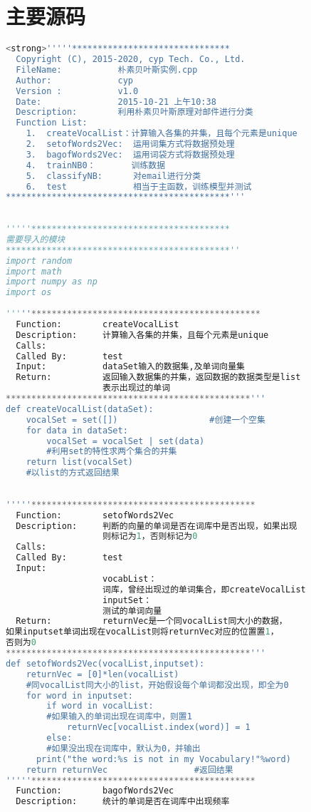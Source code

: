 ﻿\chapter{主要源码}

\begin{lstlisting}[language=python]
<strong>'''''******************************* 
  Copyright (C), 2015-2020, cyp Tech. Co., Ltd. 
  FileName:           朴素贝叶斯实例.cpp 
  Author:             cyp      
  Version :           v1.0           
  Date:               2015-10-21 上午10:38 
  Description:        利用朴素贝叶斯原理对邮件进行分类      
  Function List:       
    1.  createVocalList：计算输入各集的并集，且每个元素是unique 
    2.  setofWords2Vec:  运用词集方式将数据预处理 
    3.  bagofWords2Vec:  运用词袋方式将数据预处理 
    4.  trainNB0：       训练数据 
    5.  classifyNB:      对email进行分类 
    6.  test             相当于主函数，训练模型并测试 
********************************************'''  
  
  
'''''*************************************** 
需要导入的模块 
********************************************''  
import random  
import math  
import numpy as np  
import os  
  
'''''********************************************* 
  Function:        createVocalList 
  Description:     计算输入各集的并集，且每个元素是unique 
  Calls:            
  Called By:       test 
  Input:           dataSet输入的数据集,及单词向量集 
  Return:          返回输入数据集的并集，返回数据的数据类型是list 
                   表示出现过的单词 
************************************************'''  
def createVocalList(dataSet):  
    vocalSet = set([])                  #创建一个空集  
    for data in dataSet:  
        vocalSet = vocalSet | set(data) 
        #利用set的特性求两个集合的并集  
    return list(vocalSet)               
    #以list的方式返回结果  
      
      
'''''******************************************** 
  Function:        setofWords2Vec 
  Description:     判断的向量的单词是否在词库中是否出现，如果出现 
                   则标记为1，否则标记为0 
  Calls:            
  Called By:       test 
  Input: 
                   vocabList： 
                   词库，曾经出现过的单词集合，即createVocalList 
                   inputSet： 
                   测试的单词向量 
  Return:          returnVec是一个同vocalList同大小的数据，
如果inputset单词出现在vocalList则将returnVec对应的位置置1，
否则为0 
************************************************'''  
def setofWords2Vec(vocalList,inputset):  
    returnVec = [0]*len(vocalList)         
    #同vocalList同大小的list，开始假设每个单词都没出现，即全为0  
    for word in inputset:                                          
        if word in vocalList:        
        #如果输入的单词出现在词库中，则置1     
            returnVec[vocalList.index(word)] = 1  
        else:                        
        #如果没出现在词库中，默认为0，并输出  
      print("the word:%s is not in my Vocabulary!"%word)  
    return returnVec                 #返回结果  
'''''********************************************
  Function:        bagofWords2Vec 
  Description:     统计的单词是否在词库中出现频率 
                  

\end{lstlisting}
